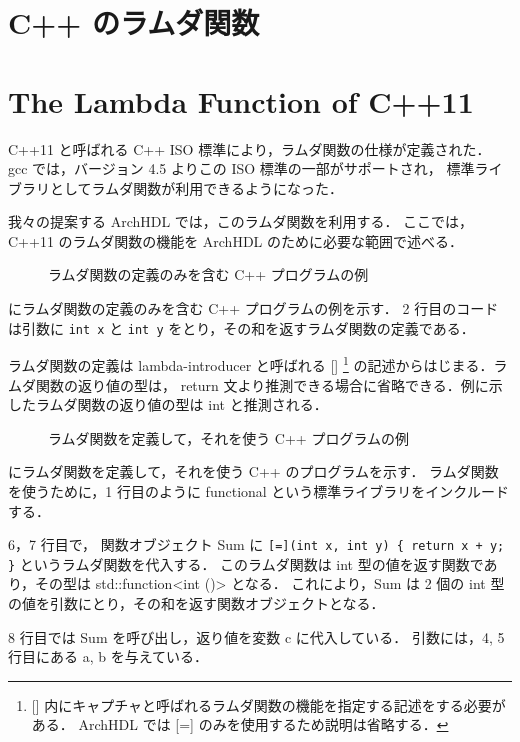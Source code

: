 \section{C++ のラムダ関数}
\fi
\section{The Lambda Function of C++11}


C++11 と呼ばれる C++ ISO 標準により，ラムダ関数の仕様が定義された． gcc
では，バージョン 4.5 よりこの ISO 標準の一部がサポートされ，
標準ライブラリとしてラムダ関数が利用できるようになった．

我々の提案する ArchHDL では，このラムダ関数を利用する． ここでは，C++11
のラムダ関数の機能を ArchHDL のために必要な範囲で述べる．

\begin{figure}[t]
 
 \caption{ラムダ関数の定義のみを含む C++ プログラムの例}
 \label{src:def_lambda}
\end{figure}

 にラムダ関数の定義のみを含む C++
プログラムの例を示す． 2 行目のコードは引数に \verb`int x` と
\verb`int y` をとり，その和を返すラムダ関数の定義である．

ラムダ関数の定義は lambda-introducer と呼ばれる {[}{]} \footnote{
[] 内にキャプチャと呼ばれるラムダ関数の機能を指定する記述をする必要がある．
ArchHDL では [=] のみを使用するため説明は省略する．
} の記述からはじまる．ラムダ関数の返り値の型は， return
文より推測できる場合に省略できる．例に示したラムダ関数の返り値の型は int
と推測される．

\begin{figure}[t]
 
 \caption{ラムダ関数を定義して，それを使う C++ プログラムの例}
 \label{src:ex_lambda}
\end{figure}

 にラムダ関数を定義して，それを使う C++
のプログラムを示す． ラムダ関数を使うために，1 行目のように functional
という標準ライブラリをインクルードする．

6，7 行目で， 関数オブジェクト Sum に
\verb`[=](int x, int y) { return x + y; }` というラムダ関数を代入する．
このラムダ関数は int 型の値を返す関数であり，その型は
std::function\textless{}int ()\textgreater{} となる． これにより，Sum は
2 個の int 型の値を引数にとり，その和を返す関数オブジェクトとなる．

8 行目では Sum を呼び出し，返り値を変数 c に代入している． 引数には，4,
5 行目にある a, b を与えている．


